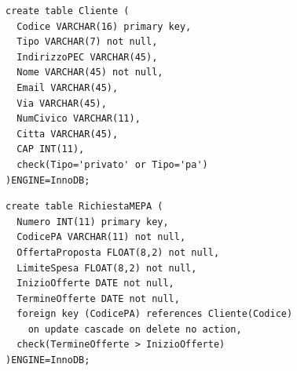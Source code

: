

\vspace{1cm} %
\begin{verbatim}
create table Cliente (
  Codice VARCHAR(16) primary key,
  Tipo VARCHAR(7) not null,
  IndirizzoPEC VARCHAR(45),
  Nome VARCHAR(45) not null,
  Email VARCHAR(45),
  Via VARCHAR(45),
  NumCivico VARCHAR(11),
  Citta VARCHAR(45),
  CAP INT(11),
  check(Tipo='privato' or Tipo='pa')
)ENGINE=InnoDB;
\end{verbatim}
\vspace{0.5cm}

\noindent{}
\newline\newline

\begin{verbatim}
create table RichiestaMEPA (
  Numero INT(11) primary key,
  CodicePA VARCHAR(11) not null,
  OffertaProposta FLOAT(8,2) not null,
  LimiteSpesa FLOAT(8,2) not null,
  InizioOfferte DATE not null,
  TermineOfferte DATE not null,
  foreign key (CodicePA) references Cliente(Codice)
    on update cascade on delete no action,
  check(TermineOfferte > InizioOfferte)
)ENGINE=InnoDB;
\end{verbatim}
\vspace{0.5cm}

\noindent{}
\newline\newline

